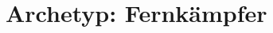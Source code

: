 \documentclass[10pt, a4paper, oneside]{book}
\begin{document}

\chapter{Archetyp: Fernkämpfer}
\label{Fernkämpfer}
\end{document}
